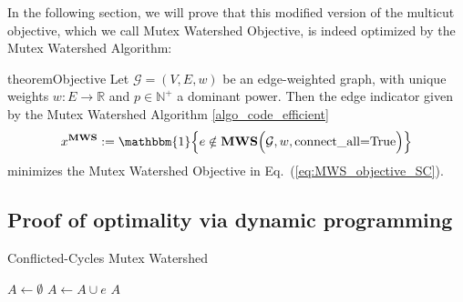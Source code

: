 In the following section, we will prove that this modified version of the multicut objective, which we call Mutex Watershed Objective, is indeed optimized by the Mutex Watershed Algorithm:

\begin{restatable}{theorem}{Objective}\label{theo:optimal_v1}
Let $\mathcal{G} = (V, E, w)$ be an edge-weighted graph, with unique weights $w:E \rightarrow \mathbb{R}$ and $p \in \mathbb{N}^+$ a dominant power. Then the edge indicator given by the Mutex Watershed Algorithm \ref{algo_code_efficient} $$x^{\mathbf{MWS}} := \mathbbm{1}\Big\{e \notin \mathbf{MWS}\Big(\mathcal{G}, w, \operator{connect\_all=True}\Big)\Big\}$$ minimizes the Mutex Watershed Objective in Eq.~(\ref{eq:MWS_objective_SC}).
\end{restatable} 
\noindent 

\subsection{Proof of optimality via dynamic programming} \label{sec:optimality_MWS}

\begin{algorithm}[t]
  \caption{Conflicted-Cycles Mutex Watershed}
  \begin{algorithmic}[1]
      \State $A \leftarrow \emptyset$\;
              \State $A \leftarrow A \cup e$
          \EndIf
        \EndFor
        \State
        \Return $A$
      \EndProcedure
  \end{algorithmic}
    \label{MWS_conflicted_cycles}

\end{algorithm}


    
